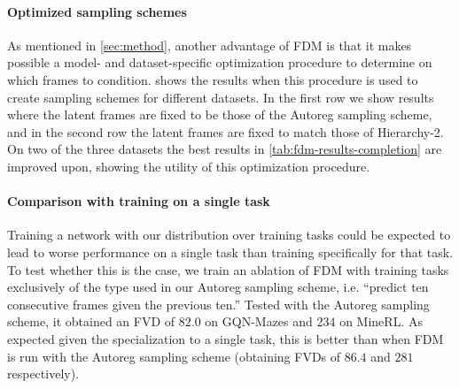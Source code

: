 \paragraph{Optimized sampling schemes}
As mentioned in \cref{sec:method}, another advantage of FDM is that it makes possible a model- and dataset-specific optimization procedure to determine on which frames to condition.  shows the results when this procedure is used to create sampling schemes for different datasets. In the first row we show results where the latent frames are fixed to be those of the Autoreg sampling scheme, and in the second row the latent frames are fixed to match those of Hierarchy-2. On two of the three datasets the best results in \cref{tab:fdm-results-completion} are improved upon, showing the utility of this optimization procedure.

\paragraph{Comparison with training on a single task}
Training a network with our distribution over training tasks could be expected to lead to worse performance on a single task than training specifically for that task. To test whether this is the case, we train an ablation of FDM with training tasks exclusively of the type used in our Autoreg sampling scheme, i.e. ``predict ten consecutive frames given the previous ten.'' Tested with the Autoreg sampling scheme, it obtained an FVD of $82.0$ on GQN-Mazes and $234$ on MineRL. As expected given the specialization to a single task, this is better than when FDM is run with the Autoreg sampling scheme (obtaining FVDs of $86.4$ and $281$ respectively).

